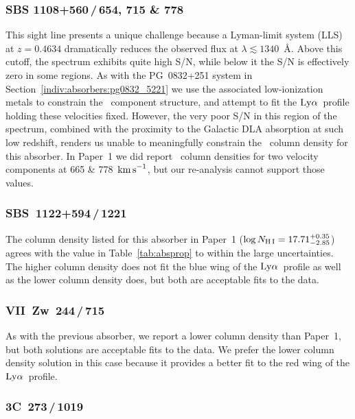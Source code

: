 \documentclass[twocolumn,twocolappendix,tighten,times]{aastex6}
\newcommand{\HI}{\ion{H}{1}}
\newcommand{\kms}{\ensuremath{{\rm km\,s}^{-1}}}
\newcommand{\lya}{\ensuremath{{\rm Ly}\alpha}}
\begin{document}
\subsubsection{SBS 1108+560\,/\,654, 715 \& 778}
\label{indiv:absorbers:sbs1108_654}

This sight line presents a unique challenge because a Lyman-limit
system (LLS) at  $z=0.4634$ dramatically reduces the observed flux at
$\lambda\lesssim1340$~\AA.  Above this cutoff, the spectrum exhibits
quite high S/N, while below it the S/N  is effectively zero in some
regions. As with the PG~0832+251 system in
Section~\ref{indiv:absorbers:pg0832_5221} we use the associated
low-ionization metals to constrain the \HI\ component structure,  
and attempt to fit the \lya\ profile
holding these velocities fixed. However, the very poor S/N in this
region of the spectrum, combined with the proximity to the  Galactic
DLA absorption at such low redshift, renders us unable to meaningfully
constrain the \HI\ column density for this absorber. In Paper~1 we did
report \HI\  column densities for two velocity components at 665 \&
778~\kms, but our  re-analysis cannot support those values.


\subsubsection{SBS~1122+594\,/\,1221}
\label{indiv:absorbers:sbs1122_1221}

The column density listed for this absorber in Paper~1 ($\log{N_{\rm 
H\,I}} =  17.71^{+0.35}_{-2.85}$) agrees with the value in
Table~\ref{tab:absprop} to  within the large uncertainties. The higher
column density does not fit the blue  wing of the \lya\ profile as
well as the lower column density does, but  both are acceptable fits
to the data.


\subsubsection{VII~Zw~244\,/\,715}
\label{indiv:absorbers:pg0838_715}

As with the previous absorber, we report a lower column density than
Paper~1, but  both solutions are acceptable fits to the data. We
prefer the lower column  density solution in this case because it
provides a better fit to the red wing of the \lya\ profile.


\subsubsection{3C~273\,/\,1019}
\label{indiv:absorbers:3c273_1019}
\end{document}
